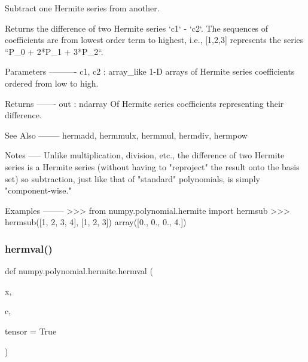 \begin{DoxyVerb}Subtract one Hermite series from another.

Returns the difference of two Hermite series `c1` - `c2`.  The
sequences of coefficients are from lowest order term to highest, i.e.,
[1,2,3] represents the series ``P_0 + 2*P_1 + 3*P_2``.

Parameters
----------
c1, c2 : array_like
    1-D arrays of Hermite series coefficients ordered from low to
    high.

Returns
-------
out : ndarray
    Of Hermite series coefficients representing their difference.

See Also
--------
hermadd, hermmulx, hermmul, hermdiv, hermpow

Notes
-----
Unlike multiplication, division, etc., the difference of two Hermite
series is a Hermite series (without having to "reproject" the result
onto the basis set) so subtraction, just like that of "standard"
polynomials, is simply "component-wise."

Examples
--------
>>> from numpy.polynomial.hermite import hermsub
>>> hermsub([1, 2, 3, 4], [1, 2, 3])
array([0.,  0.,  0.,  4.])\end{DoxyVerb}
 \mbox{\label{namespacenumpy_1_1polynomial_1_1hermite_ae26143d25de6333d811effa65e522117}} 
\subsubsection{\texorpdfstring{hermval()}{hermval()}}
{\footnotesize\ttfamily def numpy.\+polynomial.\+hermite.\+hermval (\begin{DoxyParamCaption}\item[{}]{x,  }\item[{}]{c,  }\item[{}]{tensor = {\ttfamily True} }\end{DoxyParamCaption})}


